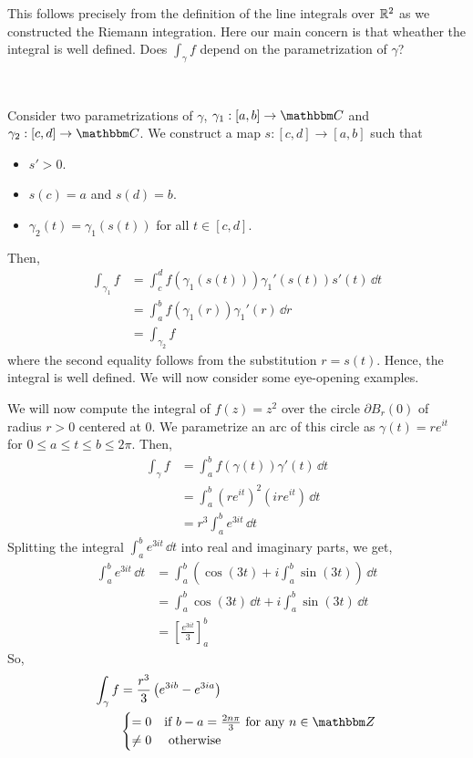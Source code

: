 \documentclass[../ComplexAnalysis_Notes.tex]{subfiles}
\begin{document}
This follows precisely from the definition of the line integrals over \(\mathbb{R}^2\) as we constructed the Riemann integration. Here our main concern is that wheather the integral is well defined. Does \(\int_\gamma f\) depend on the parametrization of \(\gamma\)?

\

Consider two parametrizations of \(\gamma\), \(\gamma_1 : [a, b] \to \C\) and \(\gamma_2 : [c, d] \to \C\). We construct a map \(s : [c, d] \to [a, b]\) such that
\begin{itemize}
  \item \(s' > 0\).
  \item \(s(c) = a\) and \(s(d) = b\).
  \item \(\gamma_2(t) = \gamma_1(s(t))\) for all \(t \in [c, d]\).
\end{itemize}
Then,
\begin{align*}
  \int_{\gamma_1} f
   & = \int_c^d f(\gamma_1(s(t))) \gamma_1'(s(t)) s'(t) \, \dd{t} \\
   & = \int_a^b f(\gamma_1(r)) \gamma_1'(r) \, \dd{r}             \\
   & = \int_{\gamma_2} f
\end{align*}
where the second equality follows from the substitution \(r = s(t)\). Hence, the integral is well defined. We will now consider some eye-opening examples.

\begin{Eg}{}{}
  We will now compute the integral of \(f(z) = z^2\) over the circle \(\partial B_r(0)\) of radius \(r > 0 \) centered at \(0\). We parametrize an arc of this circle as \(\gamma(t) = re^{it}\) for \(0 \leq a \leq t \leq b \leq 2\pi\). Then,
  \begin{align*}
    \int_\gamma f
     & = \int_a^b f(\gamma(t)) \gamma'(t) \, \dd{t} \\
     & = \int_a^b (re^{it})^2 (ire^{it}) \, \dd{t}  \\
     & = r^3 \int_a^b e^{3it} \, \dd{t}
  \end{align*}
  Splitting the integral \(\int_a^b e^{3it} \, \dd{t}\) into real and imaginary parts, we get,
  \begin{align*}
    \int_a^b e^{3it} \, \dd{t}
     & = \int_a^b (\cos(3t) + i \int_a^b \sin(3t)) \, \dd{t}         \\
     & = \int_a^b \cos(3t) \, \dd{t} + i \int_a^b \sin(3t) \, \dd{t} \\
     & = \left[ \frac{e^{3it}}{3} \right]_a^b
  \end{align*}
  So, \begin{align*}
    \int_\gamma f
     & = \frac{r^3}{3} \left( e^{3ib} - e^{3ia} \right)                      \\
     & \begin{cases}
         = 0    & \text{if } b - a = \frac{2n\pi}{3} \text{ for any } n \in \Z \\
         \neq 0 & \text{ otherwise }
       \end{cases}
  \end{align*}
\end{Eg}
\end{document}
